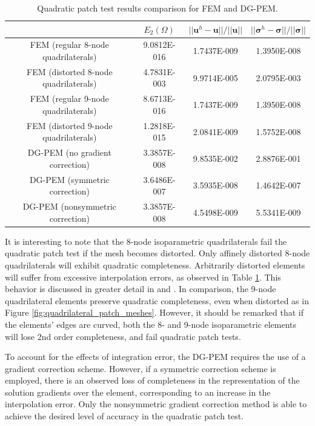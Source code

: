 \begin{table}[!ht]
  \begin{center}
    \begin{tabular}{| c || c | c | c |}
    \hline
           & $E_2 (\Omega)$ & $||\mathbf{u}^h - \mathbf{u}|| / ||\mathbf{u}||$ & $||\boldsymbol{\sigma}^h - \boldsymbol{\sigma}|| / ||\boldsymbol{\sigma}||$ \\ \hline \hline
    FEM (regular 8-node quadrilaterals) & 9.0812E-016 & 1.7437E-009 & 1.3950E-008 \\ \hline
    FEM (distorted 8-node quadrilaterals) & 4.7831E-003 & 9.9714E-005 & 2.0795E-003 \\ \hline
    FEM (regular 9-node quadrilaterals) & 8.6713E-016 & 1.7437E-009 & 1.3950E-008 \\ \hline
    FEM (distorted 9-node quadrilaterals) & 1.2818E-015 & 2.0841E-009 & 1.5752E-008 \\ \hline
    DG-PEM (no gradient correction) & 3.3857E-008 & 9.8535E-002 & 2.8876E-001 \\ \hline
    DG-PEM (symmetric correction) & 3.6486E-007 & 3.5935E-008 & 1.4642E-007 \\ \hline
    DG-PEM (nonsymmetric correction) & 3.3857E-008 & 4.5498E-009 & 5.5341E-009 \\
    \hline
    \end{tabular}
    \caption{Quadratic patch test results comparison for FEM and DG-PEM.}
    \vspace{-5pt}
    \label{tab:quadratic_patch_test}
    \vspace{-10pt}
  \end{center}
\end{table}

It is interesting to note that the 8-node isoparametric quadrilaterals fail the quadratic patch test if the mesh becomes distorted. Only affinely distorted 8-node quadrilaterals will exhibit quadratic completeness. Arbitrarily distorted elements will suffer from excessive interpolation errors, as observed in Table \ref{tab:quadratic_patch_test}. This behavior is discussed in greater detail in \cite{Arnold:02} and \cite{Arnold:01}. In comparison, the 9-node quadrilateral elements preserve quadratic completeness, even when distorted as in Figure \ref{fig:quadrilateral_patch_meshes}. However, it should be remarked that if the elements' edges are curved, both the 8- and 9-node isoparametric elements will lose 2nd order completeness, and fail quadratic patch tests.

To account for the effects of integration error, the DG-PEM requires the use of a gradient correction scheme. However, if a symmetric correction scheme is employed, there is an observed loss of completeness in the representation of the solution gradients over the element, corresponding to an increase in the interpolation error. Only the nonsymmetric gradient correction method is able to achieve the desired level of accuracy in the quadratic patch test.

